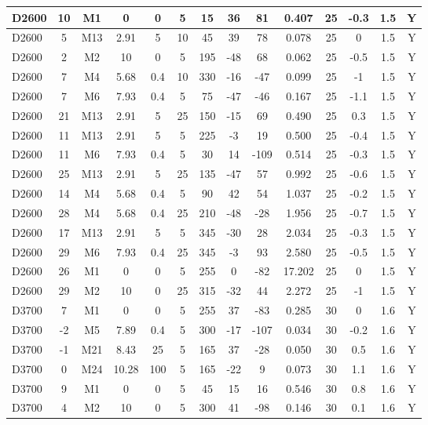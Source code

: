 \documentclass{article}
\begin{document}
\begin{center}
\begin{longtable}{|l|c|c|c|c|c|c|c|c|c|c|c|c|c|}
D2600	&	10	&	M1	&	0	&	0	&	5	&	15	&	36	&	81	&	0.407	&	25	&	-0.3	&	1.5	&	Y	\\\hline
D2600	&	5	&	M13	&	2.91	&	5	&	10	&	45	&	39	&	78	&	0.078	&	25	&	0	&	1.5	&	Y	\\\hline
D2600	&	2	&	M2	&	10	&	0	&	5	&	195	&	-48	&	68	&	0.062	&	25	&	-0.5	&	1.5	&	Y	\\\hline
D2600	&	7	&	M4	&	5.68	&	0.4	&	10	&	330	&	-16	&	-47	&	0.099	&	25	&	-1	&	1.5	&	Y	\\\hline
D2600	&	7	&	M6	&	7.93	&	0.4	&	5	&	75	&	-47	&	-46	&	0.167	&	25	&	-1.1	&	1.5	&	Y	\\\hline
D2600	&	21	&	M13	&	2.91	&	5	&	25	&	150	&	-15	&	69	&	0.490	&	25	&	0.3	&	1.5	&	Y	\\\hline
D2600	&	11	&	M13	&	2.91	&	5	&	5	&	225	&	-3	&	19	&	0.500	&	25	&	-0.4	&	1.5	&	Y	\\\hline
D2600	&	11	&	M6	&	7.93	&	0.4	&	5	&	30	&	14	&	-109	&	0.514	&	25	&	-0.3	&	1.5	&	Y	\\\hline
D2600	&	25	&	M13	&	2.91	&	5	&	25	&	135	&	-47	&	57	&	0.992	&	25	&	-0.6	&	1.5	&	Y	\\\hline
D2600	&	14	&	M4	&	5.68	&	0.4	&	5	&	90	&	42	&	54	&	1.037	&	25	&	-0.2	&	1.5	&	Y	\\\hline
D2600	&	28	&	M4	&	5.68	&	0.4	&	25	&	210	&	-48	&	-28	&	1.956	&	25	&	-0.7	&	1.5	&	Y	\\\hline
D2600	&	17	&	M13	&	2.91	&	5	&	5	&	345	&	-30	&	28	&	2.034	&	25	&	-0.3	&	1.5	&	Y	\\\hline
D2600	&	29	&	M6	&	7.93	&	0.4	&	25	&	345	&	-3	&	93	&	2.580	&	25	&	-0.5	&	1.5	&	Y	\\\hline
D2600	&	26	&	M1	&	0	&	0	&	5	&	255	&	0	&	-82	&	17.202	&	25	&	0	&	1.5	&	Y	\\\hline
D2600	&	29	&	M2	&	10	&	0	&	25	&	315	&	-32	&	44	&	2.272	&	25	&	-1	&	1.5	&	Y	\\\hline
D3700	&	7	&	M1	&	0	&	0	&	5	&	255	&	37	&	-83	&	0.285	&	30	&	0	&	1.6	&	Y	\\\hline
D3700	&	-2	&	M5	&	7.89	&	0.4	&	5	&	300	&	-17	&	-107	&	0.034	&	30	&	-0.2	&	1.6	&	Y	\\\hline
D3700	&	-1	&	M21	&	8.43	&	25	&	5	&	165	&	37	&	-28	&	0.050	&	30	&	0.5	&	1.6	&	Y	\\\hline
D3700	&	0	&	M24	&	10.28	&	100	&	5	&	165	&	-22	&	9	&	0.073	&	30	&	1.1	&	1.6	&	Y	\\\hline
D3700	&	9	&	M1	&	0	&	0	&	5	&	45	&	15	&	16	&	0.546	&	30	&	0.8	&	1.6	&	Y	\\\hline
D3700	&	4	&	M2	&	10	&	0	&	5	&	300	&	41	&	-98	&	0.146	&	30	&	0.1	&	1.6	&	Y	\\\hline

\end{longtable}
\end{center}
\end{document}
